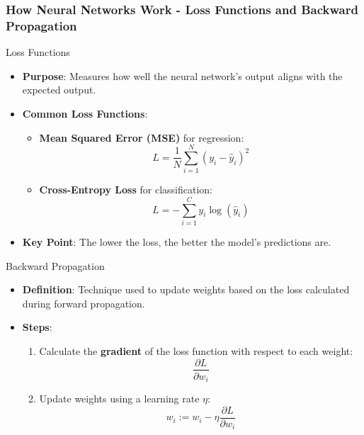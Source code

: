 \documentclass[aspectratio=169]{beamer}
\begin{document}
\begin{frame}[fragile]
    \frametitle{How Neural Networks Work - Loss Functions and Backward Propagation}
    \begin{block}{Loss Functions}
        \begin{itemize}
            \item \textbf{Purpose}: Measures how well the neural network's output aligns with the expected output.
            
            \item \textbf{Common Loss Functions}:
            \begin{itemize}
                \item \textbf{Mean Squared Error (MSE)} for regression:
                \begin{equation}
                L = \frac{1}{N} \sum_{i=1}^{N} (y_i - \hat{y}_i)^2
                \end{equation}
                
                \item \textbf{Cross-Entropy Loss} for classification:
                \begin{equation}
                L = -\sum_{i=1}^{C} y_{i} \log(\hat{y}_{i})
                \end{equation}
            \end{itemize}        
            \item \textbf{Key Point}: The lower the loss, the better the model's predictions are.
        \end{itemize}
    \end{block}
    
    \begin{block}{Backward Propagation}
        \begin{itemize}
            \item \textbf{Definition}: Technique used to update weights based on the loss calculated during forward propagation.
            
            \item \textbf{Steps}:
            \begin{enumerate}
                \item Calculate the \textbf{gradient} of the loss function with respect to each weight:
                \begin{equation}
                \frac{\partial L}{\partial w_i}
                \end{equation}
                \item Update weights using a learning rate \(\eta\):
                \begin{equation}
                w_i := w_i - \eta \frac{\partial L}{\partial w_i}
                \end{equation}
            \end{enumerate}
        \end{itemize}
    \end{block}
\end{frame}
\end{document}
